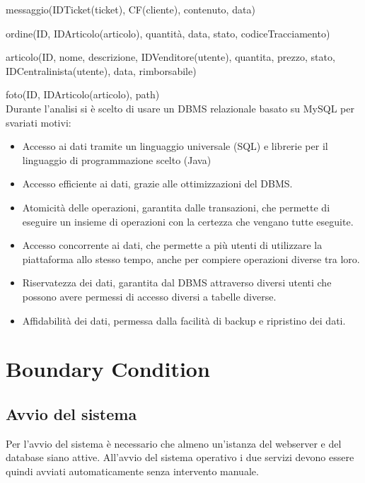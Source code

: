 \documentclass[12pt,a4paper]{article}
\begin{document}
\noindent
messaggio(IDTicket(ticket), CF(cliente), contenuto, data)

\noindent
ordine(ID, IDArticolo(articolo), quantità, data, stato, codiceTracciamento)

\noindent
articolo(ID, nome, descrizione, IDVenditore(utente), quantita, prezzo, stato, IDCentralinista(utente), data, rimborsabile)

\noindent
foto(ID, IDArticolo(articolo), path) \\


\noindent
Durante l'analisi si è scelto di usare un DBMS relazionale basato su MySQL per svariati motivi:

\begin{itemize}
\item Accesso ai dati tramite un linguaggio universale (SQL) e librerie per il linguaggio di programmazione scelto (Java)
\item Accesso efficiente ai dati, grazie alle ottimizzazioni del DBMS.
\item Atomicità delle operazioni, garantita dalle transazioni, che permette di eseguire un insieme di operazioni con la certezza che vengano tutte eseguite.
\item Accesso concorrente ai dati, che permette a più utenti di utilizzare la piattaforma allo stesso tempo, anche per compiere operazioni diverse tra loro.
\item Riservatezza dei dati, garantita dal DBMS attraverso diversi utenti che possono avere permessi di accesso diversi a tabelle diverse.
\item Affidabilità dei dati, permessa dalla facilità di backup e ripristino dei dati.
\end{itemize}


\newpage

\section{Boundary Condition}
\subsection{Avvio del sistema}
Per l'avvio del sistema è necessario che almeno un'istanza del webserver e del database siano attive.
All'avvio del sistema operativo i due servizi devono essere quindi avviati automaticamente senza intervento manuale.
\end{document}
